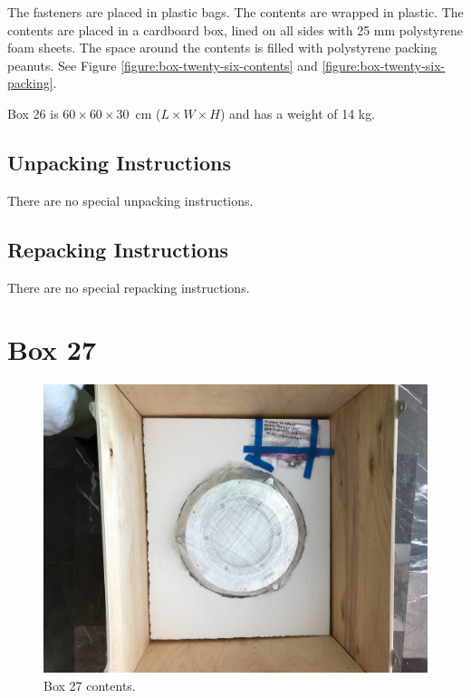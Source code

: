 \documentclass{article}
\begin{document}
The fasteners are placed in plastic bags. The contents are wrapped in plastic. The contents are placed in a cardboard box, lined on all sides with 25 mm polystyrene foam sheets. The space around the contents is filled with polystyrene packing peanuts. See Figure \ref{figure:box-twenty-six-contents} and \ref{figure:box-twenty-six-packing}.

Box 26 is  $60 \times 60 \times 30$~cm ($L \times W \times H$) and has a weight of 14 kg.

\subsection{Unpacking Instructions}

There are no special unpacking instructions.

\subsection{Repacking Instructions}

There are no special repacking instructions.


\clearpage
\section{Box 27}

\begin{figure}[bp]
\begin{center}
\includegraphics[width=0.80\linewidth]{figures/20210106T114250.jpg}
\end{center}
\caption{Box 27 contents.}
\label{figure:box-twenty-seven-contents}
\end{figure}
\end{document}
